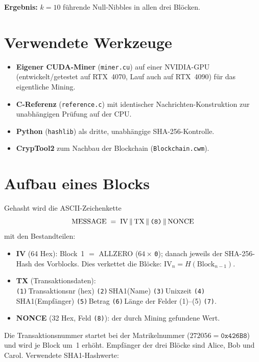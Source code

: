 \documentclass[
    fontsize=12pt,          %
    paper=a4,               %
    numbers=noenddot,       %
    listof=totoc,           %
    listof=entryprefix,     %
    listof=nochaptergap,    %
    bibliography=totoc,     %
    parskip=half,           %
    openany                 %
]{scrbook}
\begin{document}
\noindent\textbf{Ergebnis:} $k = 10$ führende Null-Nibbles in allen drei Blöcken.


\section*{Verwendete Werkzeuge}

\begin{itemize}
    \item \textbf{Eigener CUDA-Miner} (\texttt{miner.cu}) auf einer NVIDIA-GPU (entwickelt/getestet
          auf RTX~4070, Lauf auch auf RTX~4090) für das eigentliche Mining.
    \item \textbf{C-Referenz} (\texttt{reference.c}) mit identischer Nachrichten-Konstruktion zur
          unabhängigen Prüfung auf der CPU.
    \item \textbf{Python} (\texttt{hashlib}) als dritte, unabhängige SHA-256-Kontrolle.
    \item \textbf{CrypTool2} zum Nachbau der Blockchain (\texttt{Blockchain.cwm}).
\end{itemize}


\section*{Aufbau eines Blocks}

Gehasht wird die ASCII-Zeichenkette
\[
  \text{MESSAGE} \;=\; \text{IV} \,\Vert\, \text{TX} \,\Vert\, \text{\texttt{(8)}} \,\Vert\, \text{NONCE}
\]
mit den Bestandteilen:

\begin{itemize}
    \item \textbf{IV} (64 Hex): Block~1 $=$ ALLZERO ($64\times$\,\texttt{0}); danach jeweils der
          SHA-256-Hash des Vorblocks. Dies verkettet die Blöcke: $\text{IV}_n = H(\text{Block}_{n-1})$.
    \item \textbf{TX} (Transaktionsdaten):\\
          \texttt{(1)}\,Transaktionsnr (hex) \texttt{(2)}\,SHA1(Name)
          \texttt{(3)}\,Unixzeit \texttt{(4)}\,SHA1(Empfänger)
          \texttt{(5)}\,Betrag \texttt{(6)}\,Länge der Felder (1)--(5) \texttt{(7)}.
    \item \textbf{NONCE} (32 Hex, Feld \texttt{(8)}): der durch Mining gefundene Wert.
\end{itemize}

\noindent Die Transaktionsnummer startet bei der Matrikelnummer ($272056 = \texttt{0x426B8}$) und
wird je Block um~1 erhöht. Empfänger der drei Blöcke sind Alice, Bob und Carol.
Verwendete SHA1-Hashwerte:
\end{document}
